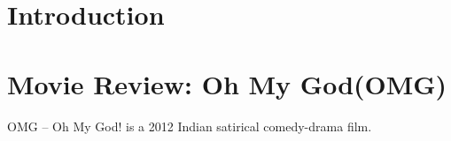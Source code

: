 \documentclass{article}
\begin{document}
\section{Introduction}
\section{Movie Review: Oh My God(OMG)}
OMG – Oh My God! is a 2012 Indian satirical comedy-drama film. 
\end{document}
